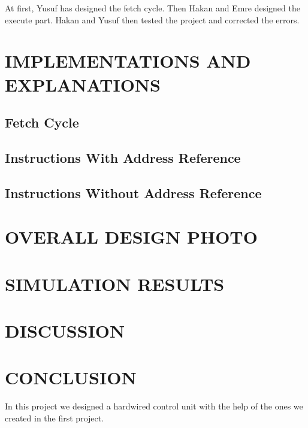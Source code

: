 \documentclass[pdftex,12pt,a4paper]{article}
\begin{document}
At first, Yusuf has designed the fetch cycle. Then Hakan and Emre designed the execute part. Hakan and Yusuf then tested the project and corrected the errors.


\section{IMPLEMENTATIONS AND EXPLANATIONS }
\subsection{Fetch Cycle}

\subsection{Instructions With Address Reference}

\subsection{Instructions Without Address Reference}






\section{OVERALL DESIGN PHOTO}








\section{SIMULATION RESULTS}




\section{DISCUSSION}






\section{CONCLUSION}
In this project we designed a hardwired control unit with the help of the ones we created in the first project. 
\end{document}
